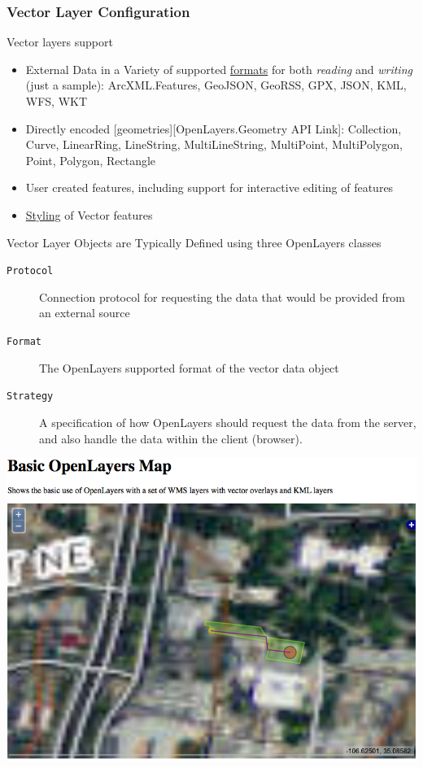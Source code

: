 \documentclass[]{article}
\begin{document}
\subsubsection{Vector Layer
Configuration}\label{vector-layer-configuration}

Vector layers support

\begin{itemize}
\itemsep1pt\parskip0pt
\item
  External Data in a Variety of supported
  \href{http://dev.openlayers.org/releases/OpenLayers-2.13/doc/apidocs/files/OpenLayers/Format-js.html}{formats}
  for both \emph{reading} and \emph{writing} (just a sample):
  ArcXML.Features, GeoJSON, GeoRSS, GPX, JSON, KML, WFS, WKT
\item
  Directly encoded {[}geometries{]}{[}OpenLayers.Geometry API Link{]}:
  Collection, Curve, LinearRing, LineString, MultiLineString,
  MultiPoint, MultiPolygon, Point, Polygon, Rectangle
\item
  User created features, including support for interactive editing of
  features
\item
  \href{http://dev.openlayers.org/releases/OpenLayers-2.13/doc/apidocs/files/OpenLayers/Feature/Vector-js.html\#OpenLayers.Feature.Vector.style}{Styling}
  of Vector features
\end{itemize}

Vector Layer Objects are Typically Defined using three OpenLayers
classes

\begin{description}
\item[\texttt{Protocol}]
Connection protocol for requesting the data that would be provided from
an external source
\item[\texttt{Format}]
The OpenLayers supported format of the vector data object
\item[\texttt{Strategy}]
A specification of how OpenLayers should request the data from the
server, and also handle the data within the client (browser).
\end{description}

\includegraphics{images/OpenLayers_03.jpg}~
\end{document}

